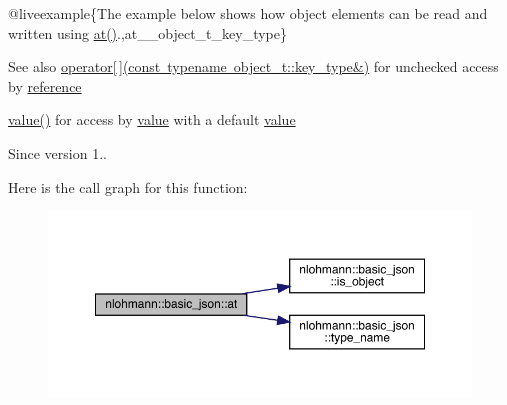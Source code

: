 @liveexample\{The example below shows how object elements can be read and written using {\ttfamily \mbox{\hyperlink{classnlohmann_1_1basic__json_a73ae333487310e3302135189ce8ff5d8}{at()}}}.,at\+\_\+\+\_\+object\+\_\+t\+\_\+key\+\_\+type\}

\begin{DoxySeeAlso}{See also}
\mbox{\hyperlink{classnlohmann_1_1basic__json_a233b02b0839ef798942dd46157cc0fe6}{operator\mbox{[}$\,$\mbox{]}(const typename object\+\_\+t\+::key\+\_\+type\&)}} for unchecked access by \mbox{\hyperlink{classnlohmann_1_1basic__json_ac6a5eddd156c776ac75ff54cfe54a5bc}{reference}} 

\mbox{\hyperlink{classnlohmann_1_1basic__json_af9c51328fbe1da75eca750be3009917a}{value()}} for access by \mbox{\hyperlink{classnlohmann_1_1basic__json_af9c51328fbe1da75eca750be3009917a}{value}} with a default \mbox{\hyperlink{classnlohmann_1_1basic__json_af9c51328fbe1da75eca750be3009917a}{value}}
\end{DoxySeeAlso}
\begin{DoxySince}{Since}
version 1.. 
\end{DoxySince}
Here is the call graph for this function\+:
\nopagebreak
\begin{figure}[H]
\begin{center}
\leavevmode
\includegraphics[width=350pt]{classnlohmann_1_1basic__json_a93403e803947b86f4da2d1fb3345cf2c_cgraph}
\end{center}
\end{figure}
\mbox{\label{classnlohmann_1_1basic__json_acac9d438c9bb12740dcdb01069293a34}} 
